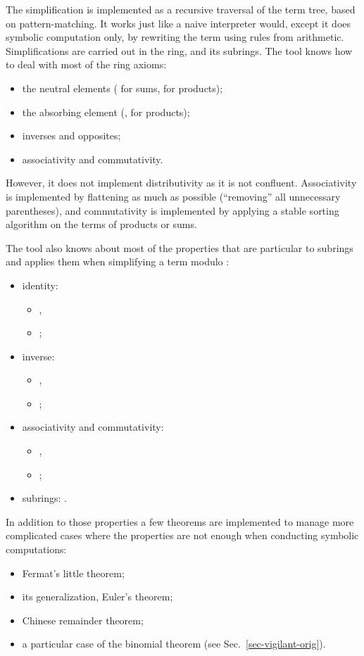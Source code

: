 \documentclass[10pt]{article}
\theoremstyle{definition}
\theoremstyle{theorem}
\begin{document}
The simplification is implemented as a recursive traversal of the term tree, based on pattern-matching.
It works just like a naive interpreter would, except it does symbolic computation only, by rewriting the term using rules from arithmetic.
Simplifications are carried out in the  ring, and its  subrings.
The tool knows how to deal with most of the  ring axioms:
\begin{itemize}
\item the neutral elements ( for sums,  for products);
\item the absorbing element (, for products);
\item inverses and opposites;
\item associativity and commutativity.
\end{itemize}
However, it does not implement distributivity as it is not confluent. Associativity is implemented by flattening as much as possible (``removing'' all unnecessary parentheses), and commutativity is implemented by applying a stable sorting algorithm on the terms of products or sums.

The tool also knows about most of the properties that are particular to  subrings and applies them when simplifying a term modulo :
\begin{itemize}
\item identity:
  \begin{itemize}
  \item ,
  \item ;
  \end{itemize}
\item inverse:
  \begin{itemize}
  \item ,
  \item ;
  \end{itemize}
\item associativity and commutativity:
  \begin{itemize}
  \item ,
  \item ;
  \end{itemize}
\item subrings: .
\end{itemize}

In addition to those properties a few theorems are implemented to manage more complicated cases where the properties are not enough when conducting symbolic computations:
\begin{itemize}
\item Fermat's little theorem;
\item its generalization, Euler's theorem;
\item Chinese remainder theorem;
\item a particular case of the binomial theorem (see Sec.~\ref{sec-vigilant-orig}).
\end{itemize}
\end{document}
